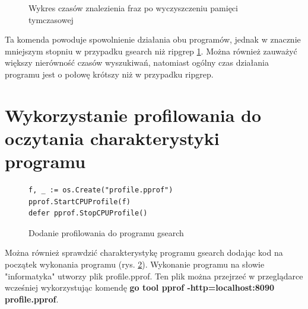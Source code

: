 \begin{figure}[ht]
    \centering
    \caption{Wykres czasów znalezienia fraz po wyczyszczeniu pamięci tymczasowej}
    \label{fig:wykresPorównaniaCzasówWyszukańUncached}
\end{figure}

Ta komenda powoduje spowolnienie działania obu programów, jednak w znacznie
mniejszym stopniu w przypadku gsearch niż ripgrep \ref{fig:wykresPorównaniaCzasówWyszukańUncached}.
Można również zauważyć większy nierówność czasów wyszukiwań, natomiast
ogólny czas działania programu jest o połowę krótszy niż w przypadku ripgrep.

\section{Wykorzystanie profilowania do oczytania charakterystyki programu}

\begin{figure}[h]
  \centering
  \begin{lstlisting}
f, _ := os.Create("profile.pprof")
pprof.StartCPUProfile(f)
defer pprof.StopCPUProfile()
  \end{lstlisting}
  \caption{Dodanie profilowania do programu gsearch}
  \label{fig:code:profilerGsearch}
\end{figure}

Można również sprawdzić charakterystykę programu gsearch dodając kod na początek 
wykonania programu (rys. \ref{fig:code:profilerGsearch}). Wykonanie programu na
słowie "informatyka" utworzy plik profile.pprof. Ten plik można przejrzeć w 
przeglądarce wcześniej wykorzystując komendę \textbf{go tool pprof -http=localhost:8090 profile.pprof}.

